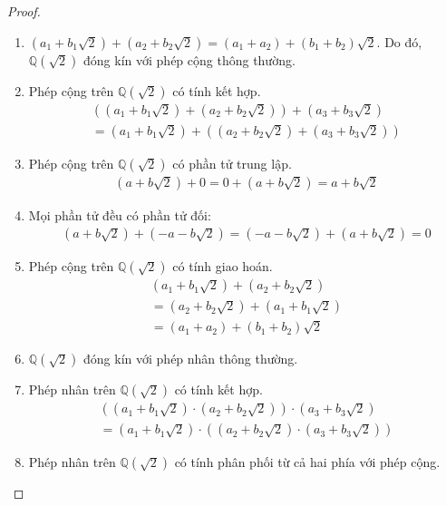 \documentclass[class=linearalgebra,crop=false]{standalone}
\begin{document}
\begin{proof}
    \begin{enumerate}[label = (\roman*)]
        \item $(a_{1} + b_{1}\sqrt{2}) + (a_{2} + b_{2}\sqrt{2}) = (a_{1} + a_{2}) + (b_{1} + b_{2})\sqrt{2}$. Do đó, $\mathbb{Q}(\sqrt{2})$ đóng kín với phép cộng thông thường.
        \item Phép cộng trên $\mathbb{Q}(\sqrt{2})$ có tính kết hợp.
        \begin{gather*}
            ((a_{1} + b_{1}\sqrt{2}) + (a_{2} + b_{2}\sqrt{2})) + (a_{3} + b_{3}\sqrt{2}) \\
            = (a_{1} + b_{1}\sqrt{2}) + ((a_{2} + b_{2}\sqrt{2}) + (a_{3} + b_{3}\sqrt{2}))
        \end{gather*}
        \item Phép cộng trên $\mathbb{Q}(\sqrt{2})$ có phần tử trung lập.
        \begin{gather*}
            (a + b\sqrt{2}) + 0 = 0 + (a + b\sqrt{2}) = a + b\sqrt{2}
        \end{gather*}
        \item Mọi phần tử đều có phần tử đối:
        \begin{gather*}
            (a + b\sqrt{2}) + (-a - b\sqrt{2}) = (-a - b\sqrt{2}) + (a + b\sqrt{2}) = 0
        \end{gather*}
        \item Phép cộng trên $\mathbb{Q}(\sqrt{2})$ có tính giao hoán.
        \begin{gather*}
            (a_{1} + b_{1}\sqrt{2}) + (a_{2} + b_{2}\sqrt{2}) \\
            = (a_{2} + b_{2}\sqrt{2}) + (a_{1} + b_{1}\sqrt{2}) \\
            = (a_{1} + a_{2}) + (b_{1} + b_{2})\sqrt{2}
        \end{gather*}
        \item $\mathbb{Q}(\sqrt{2})$ đóng kín với phép nhân thông thường.
        \item Phép nhân trên $\mathbb{Q}(\sqrt{2})$ có tính kết hợp.
        \begin{gather*}
            ((a_{1} + b_{1}\sqrt{2}) \cdot (a_{2} + b_{2}\sqrt{2}))\cdot(a_{3} + b_{3}\sqrt{2}) \\
            = (a_{1} + b_{1}\sqrt{2}) \cdot ((a_{2} + b_{2}\sqrt{2})\cdot(a_{3} + b_{3}\sqrt{2}))
        \end{gather*}
        \item Phép nhân trên $\mathbb{Q}(\sqrt{2})$ có tính phân phối từ cả hai phía với phép cộng.

\end{enumerate}
\end{proof}
\end{document}
